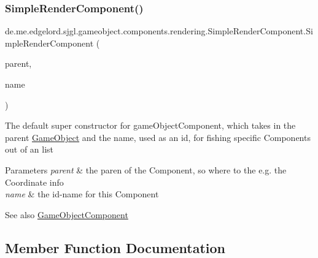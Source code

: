 \subsubsection{\texorpdfstring{Simple\+Render\+Component()}{SimpleRenderComponent()}}
{\footnotesize\ttfamily de.\+me.\+edgelord.\+sjgl.\+gameobject.\+components.\+rendering.\+Simple\+Render\+Component.\+Simple\+Render\+Component (\begin{DoxyParamCaption}\item[{\mbox{\hyperlink{classde_1_1me_1_1edgelord_1_1sjgl_1_1gameobject_1_1_game_object}{Game\+Object}}}]{parent,  }\item[{String}]{name }\end{DoxyParamCaption})}

The default super constructor for game\+Object\+Component, which takes in the parent \mbox{\hyperlink{classde_1_1me_1_1edgelord_1_1sjgl_1_1gameobject_1_1_game_object}{Game\+Object}} and the name, used as an id, for fishing specific Components out of an list


\begin{DoxyParams}{Parameters}
{\em parent} & the paren of the Component, so where to the e.\+g. the Coordinate info \\
\hline
{\em name} & the id-\/name for this Component \\
\hline
\end{DoxyParams}
\begin{DoxySeeAlso}{See also}
\mbox{\hyperlink{classde_1_1me_1_1edgelord_1_1sjgl_1_1gameobject_1_1_game_object_component}{Game\+Object\+Component}} 
\end{DoxySeeAlso}


\subsection{Member Function Documentation}
\mbox{\label{classde_1_1me_1_1edgelord_1_1sjgl_1_1gameobject_1_1components_1_1rendering_1_1_simple_render_component_a7513032b4d5bfe60626f40e7fc6234e6}} 
